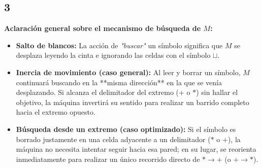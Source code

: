 \subsection{3}
\textbf{Aclaración general sobre el mecanismo de búsqueda de $M$:}
\begin{itemize}
    \item \textbf{Salto de blancos:} La acción de \textit{"buscar"} un símbolo significa que $M$ se desplaza leyendo la cinta e ignorando las celdas con el símbolo $\sqcup$.
    \item \textbf{Inercia de movimiento (caso general):} Al leer y borrar un símbolo, $M$ continuará buscando en la **misma dirección** en la que se venía desplazando. Si alcanza el delimitador del extremo ($+$ o $*$) sin hallar el objetivo, la máquina invertirá su sentido para realizar un barrido completo hacia el extremo opuesto.
    \item \textbf{Búsqueda desde un extremo (caso optimizado):} Si el símbolo es borrado justamente en una celda adyacente a un delimitador ($*$ o $+$), la máquina no necesita intentar seguir hacia esa pared; en su lugar, se reorienta inmediatamente para realizar un único recorrido directo de $* \rightarrow +$ (o $+ \rightarrow *$).
\end{itemize}

